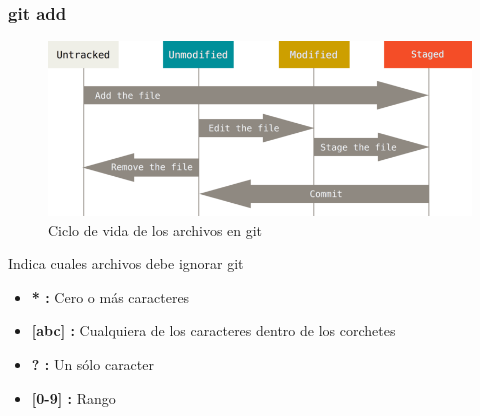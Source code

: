 \documentclass{beamer}
\begin{document}
\begin{frame}
  \frametitle{git add}
  \begin{figure}
    \centering
    \includegraphics[width=\textwidth]{ciclo}
    \caption{Ciclo de vida de los archivos en git}
  \end{figure}
\end{frame}

\begin{frame}
  \begin{center}
    \resizebox{\textwidth}{!}{\FiraTitle \color{green}{.gitignore}}
    \vspace{1em}
    
    {\FiraTitle Indica cuales archivos debe ignorar git}
    \vspace{1em}
  \end{center}
  {\FiraTitle \color{purple}{Glob patterns:}}
  \begin{itemize}
  \item \textbf{* :} Cero o más caracteres
  \item \textbf{[abc] :} Cualquiera de los caracteres dentro de los corchetes
  \item \textbf{? :} Un sólo caracter
  \item \textbf{[0-9] :} Rango
  \end{itemize}
\end{frame}
\end{document}
